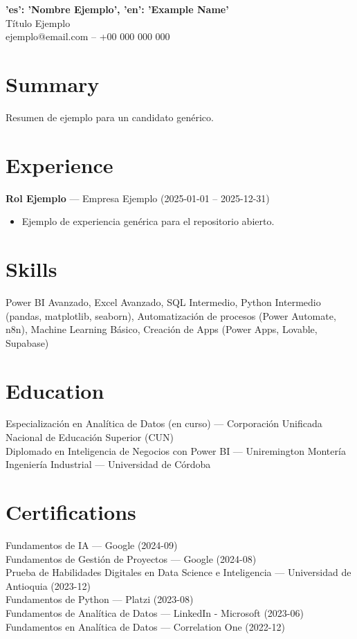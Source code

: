 \documentclass[11pt]{article}
\begin{document}
\begin{center}
{\Large \textbf{{'es': 'Nombre Ejemplo', 'en': 'Example Name'}}}\\
Título Ejemplo\\
ejemplo@email.com -- +00 000 000 000
\end{center}

\section*{Summary}
Resumen de ejemplo para un candidato genérico.

\section*{Experience}
\textbf{Rol Ejemplo} --- Empresa Ejemplo (2025-01-01 -- 2025-12-31)
\begin{itemize}[nosep]
\item Ejemplo de experiencia genérica para el repositorio abierto.
\end{itemize}

\section*{Skills}
Power BI Avanzado, Excel Avanzado, SQL Intermedio, Python Intermedio (pandas, matplotlib, seaborn), Automatización de procesos (Power Automate, n8n), Machine Learning Básico, Creación de Apps (Power Apps, Lovable, Supabase)

\section*{Education}
Especialización en Analítica de Datos (en curso) --- Corporación Unificada Nacional de Educación Superior (CUN)\\
Diplomado en Inteligencia de Negocios con Power BI --- Uniremington Montería\\
Ingeniería Industrial --- Universidad de Córdoba\\


\section*{Certifications}
Fundamentos de IA --- Google (2024-09)\\
Fundamentos de Gestión de Proyectos --- Google (2024-08)\\
Prueba de Habilidades Digitales en Data Science e Inteligencia --- Universidad de Antioquia (2023-12)\\
Fundamentos de Python --- Platzi (2023-08)\\
Fundamentos de Analítica de Datos --- LinkedIn - Microsoft (2023-06)\\
Fundamentos en Analítica de Datos --- Correlation One (2022-12)\\
\end{document}
